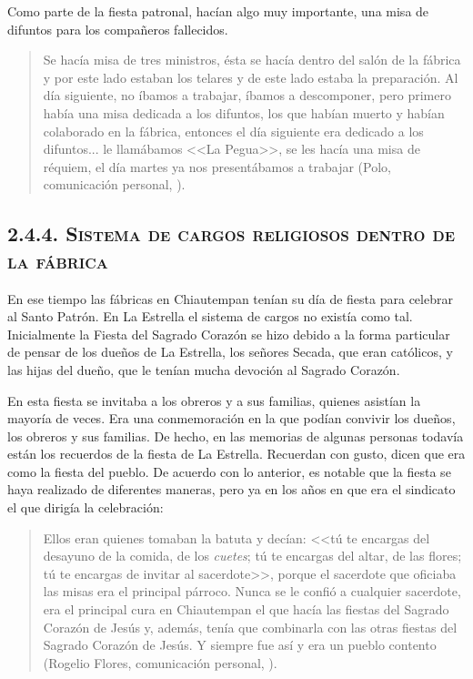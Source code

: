 \documentclass[14pt,letterpaper,twoside]{extbook} %
\begin{document}
\noindent Como parte de la fiesta patronal, hacían algo muy importante, una misa de difuntos para los compañeros fallecidos.

\begin{quote}
Se hacía misa de tres ministros, ésta se hacía dentro del salón de la fábrica y por este lado estaban los telares y de este lado estaba la preparación. Al día siguiente, no íbamos a trabajar, íbamos a descomponer, pero primero había una misa dedicada a los difuntos, los que habían muerto y habían colaborado en la fábrica, entonces el día siguiente era dedicado a los difuntos... le llamábamos <<La Pegua>>, se les hacía una misa de réquiem, el día martes ya nos presentábamos a trabajar (Polo, comunicación personal, ).
\end{quote}

\subsection*{\mdseries\large\textsc{2.4.4. Sistema de cargos religiosos dentro de la fábrica}}

\noindent En ese tiempo las fábricas en Chiautempan tenían su día de fiesta para celebrar al Santo Patrón. En La Estrella el sistema de cargos no existía como tal. Inicialmente la Fiesta del Sagrado Corazón se hizo debido a la forma particular de pensar de los dueños de La Estrella, los señores Secada, que eran católicos, y las hijas del dueño, que le tenían mucha devoción al Sagrado Corazón.

En esta fiesta se invitaba a los obreros y a sus familias, quienes asistían la mayoría de veces. Era una conmemoración en la que podían convivir los dueños, los obreros y sus familias. De hecho, en las memorias de algunas personas todavía están los recuerdos de la fiesta de La
Estrella. Recuerdan con gusto, dicen que era como la fiesta del pueblo. De acuerdo con lo anterior, es notable que la fiesta se haya realizado de diferentes maneras, pero ya en los años en que era el sindicato el que dirigía la celebración:

\begin{quotation}
\noindent Ellos eran quienes tomaban la batuta y decían: <<tú te encargas del desayuno de la comida, de los \textit{cuetes}; tú te encargas del altar, de las flores; tú te encargas de invitar al sacerdote>>, porque el sacerdote que oficiaba las misas era el principal párroco. Nunca se le confió a cualquier sacerdote, era el principal cura en Chiautempan el que hacía las fiestas del Sagrado Corazón de Jesús y, además, tenía que combinarla con las otras fiestas del Sagrado Corazón de Jesús. Y siempre fue así y era un pueblo contento (Rogelio Flores, comunicación personal, ).
\end{quotation}
\end{document}
